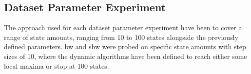 \subsection{Dataset Parameter Experiment}

The approach used for each dataset parameter experiment have been to cover a range of state amounts, ranging from 10 to 100 states alongside the previously defined parameters. \gls{bw} and \gls{sbw} were probed on specific state amounts with step sizes of 10, where the dynamic algorithms have been defined to reach either some local maxima or stop at 100 states.